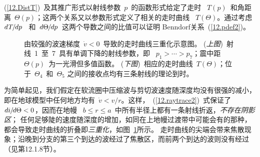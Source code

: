 (\ref{12.DistT})~及其推广形式以射线参数~$p$~的函数形式给定了走时
~$T(p)$~和角距离~$\Theta(p)$；这两个关系又以参数形式定义了相关的走时曲线
~$T(\Theta)$。通过考虑~$d\hspace{0.2 mm}T\hspace{-0.5 mm}/\hspace{-0.3 mm}dp$
~和~$d\Theta\hspace{-0.3 mm}/\hspace{-0.3 mm}dp$~这两个导数之间的比值可以证明
Benndorf关系~(\ref{12.pdef2})。
\begin{figure}[!b]
\begin{center}
\end{center}
\caption[triplication]{\label{12.fig.raytrip}
由较强的波速梯度~$\dot{v}<0$~导致的走时曲线三重化示意图。
({\em 上图\/})~射线~1~至~7~具有单调下降的射线参数，即
~$p_1>\cdots >p_7$；震中距~$\Theta(p)$~为一光滑但多值函数。
({\em 下图\/})~相应的走时曲线~$T(\Theta)$；位于~$\Theta_4$~和~$\Theta_5$ 之间的接收点均有三条射线的理论到时。}
\end{figure}
为简单起见，我们假定在软流圈中压缩波与剪切波速度随深度均没有很强的减小，即在地球模型中任何地方均有~$\dot{v} < v/r$。这样，~(\ref{12.raytrace2})~式保证了~$di\hspace{-0.2 mm}/\hspace{-0.4 mm}d\Theta <0$，因而在地幔
~$b\leq r\leq a$~中所有半径上都有一条射线折返，{\em 不存在阴影区\/}；
%
任何足够陡的速度随深度的增加，如同在上地幔过渡带中可能会有的那种，都会导致走时曲线的折叠即{\em 三重化\/}，如图~\ref{12.fig.raytrip}所示。
%
走时曲线的尖端会带来焦散现象；沿晚到分支的第三个到达的波经过了焦散区，而前两个到达的波则没有经过（见第12.1.8节）。
%

